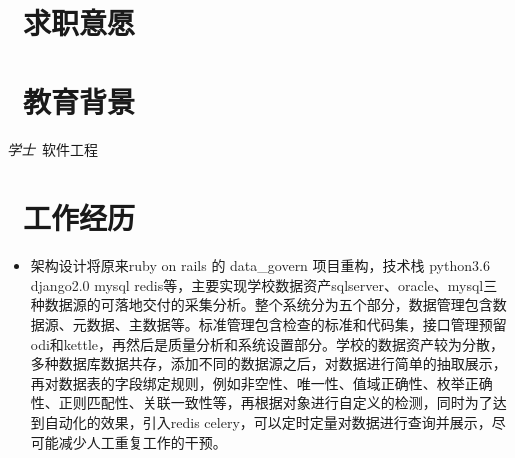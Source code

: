 \documentclass{resume}
\begin{document}



\section{\faHeartO\ 求职意愿}

\section{\faGraduationCap\ 教育背景}
\textit{学士}\ {软件工程}

\section{\faUsers\ 工作经历}
\role{python工程师}

\begin{itemize}
  \item 架构设计将原来ruby on rails 的 data\_govern 项目重构，技术栈 python3.6 django2.0 mysql redis等，主要实现学校数据资产sqlserver、oracle、mysql三种数据源的可落地交付的采集分析。整个系统分为五个部分，数据管理包含数据源、元数据、主数据等。标准管理包含检查的标准和代码集，接口管理预留odi和kettle，再然后是质量分析和系统设置部分。学校的数据资产较为分散，多种数据库数据共存，添加不同的数据源之后，对数据进行简单的抽取展示，再对数据表的字段绑定规则，例如非空性、唯一性、值域正确性、枚举正确性、正则匹配性、关联一致性等，再根据对象进行自定义的检测，同时为了达到自动化的效果，引入redis celery，可以定时定量对数据进行查询并展示，尽可能减少人工重复工作的干预。
  
\end{itemize}

\end{document}
